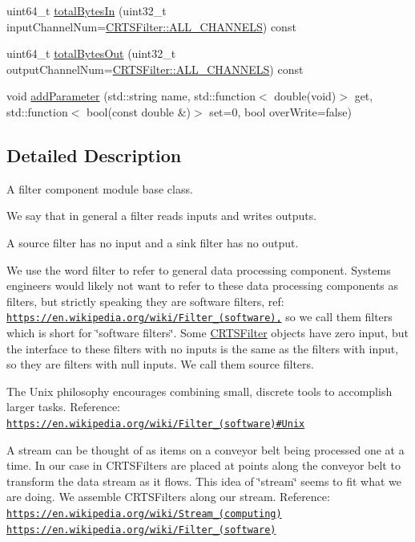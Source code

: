 \begin{DoxyCompactItemize}
\item 
uint64\+\_\+t \hyperlink{classCRTSFilter_a2790e3d559443f54724a060b5abec4b7}{total\+Bytes\+In} (uint32\+\_\+t input\+Channel\+Num=\hyperlink{classCRTSFilter_a9ea354654e8e2e8ce3bff293cc35fafe}{C\+R\+T\+S\+Filter\+::\+A\+L\+L\+\_\+\+C\+H\+A\+N\+N\+E\+LS}) const
\item 
uint64\+\_\+t \hyperlink{classCRTSFilter_a4e67f7953354ba62d0b28fec0819abb7}{total\+Bytes\+Out} (uint32\+\_\+t output\+Channel\+Num=\hyperlink{classCRTSFilter_a9ea354654e8e2e8ce3bff293cc35fafe}{C\+R\+T\+S\+Filter\+::\+A\+L\+L\+\_\+\+C\+H\+A\+N\+N\+E\+LS}) const
\item 
void \hyperlink{classCRTSFilter_acc17d29240468c94e360e1b788f5d6a0}{add\+Parameter} (std\+::string name, std\+::function$<$ double(void)$>$ get, std\+::function$<$ bool(const double \&)$>$ set=0, bool over\+Write=false)
\end{DoxyCompactItemize}


\subsection{Detailed Description}
A filter component module base class.

We say that in general a filter reads inputs and writes outputs.

A source filter has no input and a sink filter has no output.

We use the word filter to refer to general data processing component. Systems engineers would likely not want to refer to these data processing components as filters, but strictly speaking they are software filters, ref\+: \href{https://en.wikipedia.org/wiki/Filter_(software),}{\tt https\+://en.\+wikipedia.\+org/wiki/\+Filter\+\_\+(software),} so we call them filters which is short for \char`\"{}software filters\char`\"{}. Some \hyperlink{classCRTSFilter}{C\+R\+T\+S\+Filter} objects have zero input, but the interface to these filters with no inputs is the same as the filters with input, so they are filters with null inputs. We call them source filters.

The Unix philosophy encourages combining small, discrete tools to accomplish larger tasks. Reference\+: \href{https://en.wikipedia.org/wiki/Filter_(software)#Unix}{\tt https\+://en.\+wikipedia.\+org/wiki/\+Filter\+\_\+(software)\#\+Unix}

A stream can be thought of as items on a conveyor belt being processed one at a time. In our case in C\+R\+T\+S\+Filters are placed at points along the conveyor belt to transform the data stream as it flows. This idea of \char`\"{}stream\char`\"{} seems to fit what we are doing. We assemble C\+R\+T\+S\+Filters along our stream. Reference\+: \href{https://en.wikipedia.org/wiki/Stream_(computing)}{\tt https\+://en.\+wikipedia.\+org/wiki/\+Stream\+\_\+(computing)} \href{https://en.wikipedia.org/wiki/Filter_(software)}{\tt https\+://en.\+wikipedia.\+org/wiki/\+Filter\+\_\+(software)}

